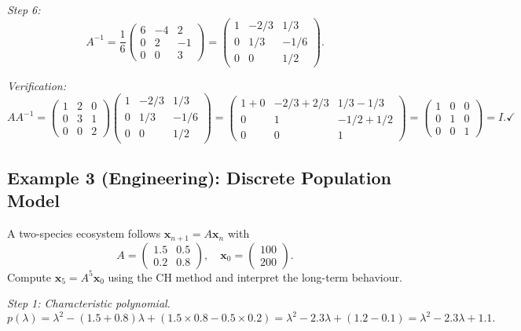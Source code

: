 \documentclass[12pt,a4paper]{article}
\begin{document}
\textit{Step 6:}
\[
  A^{-1} = \frac{1}{6}\begin{pmatrix}6 & -4 & 2 \\ 0 & 2 & -1 \\ 0 & 0 & 3\end{pmatrix}
  = \begin{pmatrix}1 & -2/3 & 1/3 \\ 0 & 1/3 & -1/6 \\ 0 & 0 & 1/2\end{pmatrix}.
\]

\textit{Verification:}
\[
  AA^{-1} = \begin{pmatrix}1&2&0\\0&3&1\\0&0&2\end{pmatrix}
  \begin{pmatrix}1 & -2/3 & 1/3 \\ 0 & 1/3 & -1/6 \\ 0 & 0 & 1/2\end{pmatrix}
  = \begin{pmatrix}1+0 & -2/3+2/3 & 1/3-1/3 \\ 0 & 1 & -1/2+1/2 \\ 0 & 0 & 1\end{pmatrix}
  = \begin{pmatrix}1&0&0\\0&1&0\\0&0&1\end{pmatrix} = I. \checkmark
\]

\subsection*{Example 3 (Engineering): Discrete Population Model}

A two-species ecosystem follows \(\mathbf{x}_{n+1} = A\mathbf{x}_n\) with
\[
  A = \begin{pmatrix}1.5 & 0.5 \\ 0.2 & 0.8\end{pmatrix}, \quad \mathbf{x}_0 = \begin{pmatrix}100 \\ 200\end{pmatrix}.
\]
Compute \(\mathbf{x}_5 = A^5\mathbf{x}_0\) using the CH method and interpret the long-term behaviour.

\textit{Step 1: Characteristic polynomial.}
\[
  p(\lambda) = \lambda^2 - (1.5+0.8)\lambda + (1.5 \times 0.8 - 0.5 \times 0.2)
  = \lambda^2 - 2.3\lambda + (1.2 - 0.1) = \lambda^2 - 2.3\lambda + 1.1.
\]
\end{document}
